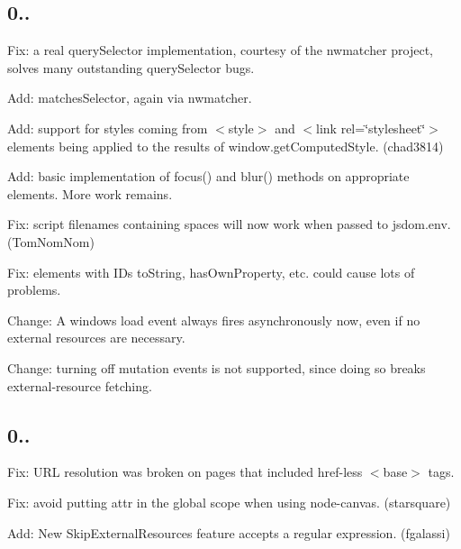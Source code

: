 \subsection*{0..}


\begin{DoxyItemize}
\item Fix\+: a real {\ttfamily query\+Selector} implementation, courtesy of the nwmatcher project, solves many outstanding {\ttfamily query\+Selector} bugs.
\item Add\+: {\ttfamily matches\+Selector}, again via nwmatcher.
\item Add\+: support for styles coming from {\ttfamily $<$style$>$} and {\ttfamily $<$link rel=\char`\"{}stylesheet\char`\"{}$>$} elements being applied to the results of {\ttfamily window.\+get\+Computed\+Style}. (chad3814)
\item Add\+: basic implementation of {\ttfamily focus()} and {\ttfamily blur()} methods on appropriate elements. More work remains.
\item Fix\+: script filenames containing spaces will now work when passed to {\ttfamily jsdom.\+env}. (Tom\+Nom\+Nom)
\item Fix\+: elements with I\+Ds {\ttfamily to\+String}, {\ttfamily has\+Own\+Property}, etc. could cause lots of problems.
\item Change\+: A window\textquotesingle{}s {\ttfamily load} event always fires asynchronously now, even if no external resources are necessary.
\item Change\+: turning off mutation events is not supported, since doing so breaks external-\/resource fetching.
\end{DoxyItemize}

\subsection*{0..}


\begin{DoxyItemize}
\item Fix\+: U\+RL resolution was broken on pages that included {\ttfamily href}-\/less {\ttfamily $<$base$>$} tags.
\item Fix\+: avoid putting {\ttfamily attr} in the global scope when using node-\/canvas. (starsquare)
\item Add\+: New {\ttfamily Skip\+External\+Resources} feature accepts a regular expression. (fgalassi)
\end{DoxyItemize}

